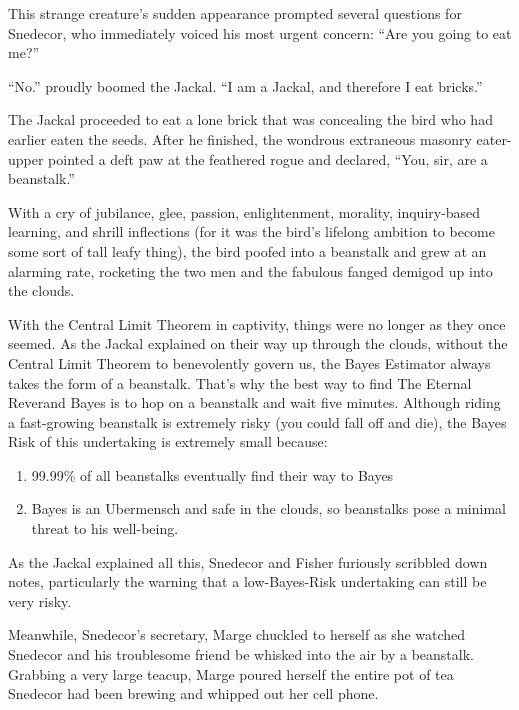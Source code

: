 \documentclass{article}
\begin{document}
This strange creature's sudden appearance prompted several questions for Snedecor, who immediately voiced his most urgent concern: ``Are you going to eat me?'' \newline

``No.'' proudly boomed the Jackal. ``I am a Jackal, and therefore I eat bricks.'' \newline

The Jackal proceeded to eat a lone brick that was concealing the bird who had earlier eaten the seeds. After he finished, the wondrous extraneous masonry eater-upper pointed a deft paw at the feathered rogue and declared, ``You, sir, are a beanstalk.'' \newline

With a cry of jubilance, glee, passion, enlightenment, morality, inquiry-based learning, and shrill inflections (for it was the bird's lifelong ambition to become some sort of tall leafy thing), the bird poofed into a beanstalk and grew at an alarming rate, rocketing the two men and the fabulous fanged demigod up into the clouds. \newline

With the Central Limit Theorem in captivity, things were no longer as they once seemed. As the Jackal explained on their way up through the clouds, without the Central Limit Theorem to benevolently govern us, the Bayes Estimator always takes the form of a beanstalk. That's why the best way to find The Eternal Reverand Bayes is to hop on a beanstalk and wait five minutes. Although riding a fast-growing beanstalk is extremely risky (you could fall off and die), the Bayes Risk of this undertaking is extremely small because:

\begin{enumerate}
\item 99.99\% of all beanstalks eventually find their way to Bayes
\item Bayes is an Ubermensch and safe in the clouds, so beanstalks pose a minimal threat to his well-being.
\end{enumerate}
As the Jackal explained all this, Snedecor and Fisher furiously scribbled down notes, particularly the warning that a low-Bayes-Risk undertaking can still be very risky.

Meanwhile, Snedecor's secretary, Marge chuckled to herself as she watched Snedecor and his troublesome friend be whisked into the air by a beanstalk. Grabbing a very large teacup, Marge poured herself the entire pot of tea Snedecor had been brewing and whipped out her cell phone. 
\end{document}
